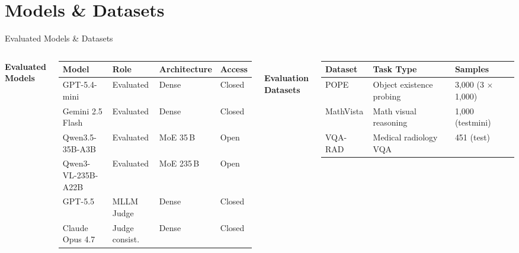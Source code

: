 \documentclass[9pt,aspectratio=169]{beamer}
\begin{document}
\section{Models \& Datasets}

\begin{frame}{Evaluated Models \& Datasets}
  \begin{columns}[T,onlytextwidth]
      \textbf{Evaluated Models}\\[0.1em]
      \footnotesize
      \renewcommand{\arraystretch}{0.9}
      \setlength{\tabcolsep}{3pt}
      \begin{tabular}{llll}
        \toprule
        Model & Role & Architecture & Access \\
        \midrule
        GPT-5.4-mini       & Evaluated      & Dense    & Closed \\
        Gemini 2.5 Flash   & Evaluated      & Dense    & Closed \\
        Qwen3.5-35B-A3B    & Evaluated      & MoE 35\,B  & Open \\
        Qwen3-VL-235B-A22B & Evaluated      & MoE 235\,B & Open \\
        \midrule
        GPT-5.5            & MLLM Judge     & Dense    & Closed \\
        Claude Opus 4.7    & Judge consist. & Dense    & Closed \\
        \bottomrule
      \end{tabular}\\[0.8em]

      \small\textbf{Evaluation Datasets}\\[0.1em]
      \footnotesize
      \setlength{\tabcolsep}{3pt}
      \begin{tabular}{lll}
        \toprule
        Dataset & Task Type & Samples \\
        \midrule
        POPE      & Object existence probing  & 3{,}000 (3 $\times$ 1{,}000) \\
        MathVista & Math visual reasoning     & 1{,}000 (testmini) \\
        VQA-RAD   & Medical radiology VQA     & 451 (test) \\
        \bottomrule
      \end{tabular}


\end{columns}
\end{frame}
\end{document}
